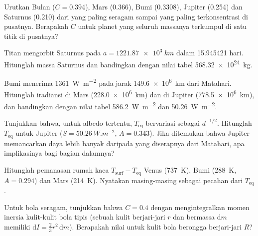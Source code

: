 \begin{exercise}[$\star$]\label{exo:b1:comparative-planetology:4}
Urutkan Bulan ($C = 0.394$), Mars (0.366), Bumi (0.3308), Jupiter (0.254) dan Saturnus (0.210) dari yang paling seragam sampai yang paling terkonsentrasi di pusatnya. Berapakah $C$ untuk planet yang seluruh massanya terkumpul di satu titik di pusatnya?
\end{exercise}

\begin{exercise}[$\star\star$]\label{exo:b1:comparative-planetology:5}
Titan mengorbit Saturnus pada $a = \qty{1221.87e3}{km}$ dalam \num{15.945421} hari. Hitunglah massa Saturnus dan bandingkan dengan nilai tabel \qty{568.32e24}{kg}.
\end{exercise}

\begin{exercise}[$\star\star$]\label{exo:b1:comparative-planetology:6}
Bumi menerima \qty{1361}{W.m^{-2}} pada jarak \qty{149.6e6}{km} dari Matahari. Hitunglah iradiansi di Mars (\qty{228.0e6}{km}) dan di Jupiter (\qty{778.5e6}{km}), dan bandingkan dengan nilai tabel \qty{586.2}{W.m^{-2}} dan \qty{50.26}{W.m^{-2}}.
\end{exercise}

\begin{exercise}[$\star\star$]\label{exo:b1:comparative-planetology:7}
Tunjukkan bahwa, untuk albedo tertentu, $T_\mathrm{eq}$ bervariasi sebagai $d^{-1/2}$. Hitunglah $T_\mathrm{eq}$ untuk Jupiter ($S = \qty{50.26}{W.m^{-2}}$, $A = 0.343$). Jika ditemukan bahwa Jupiter memancarkan daya lebih banyak daripada yang diserapnya dari Matahari, apa implikasinya bagi bagian dalamnya?
\end{exercise}

\begin{exercise}[$\star\star$]\label{exo:b1:comparative-planetology:8}
Hitunglah pemanasan rumah kaca $T_\mathrm{surf} - T_\mathrm{eq}$ Venus (\qty{737}{K}), Bumi (\qty{288}{K}, $A = 0.294$) dan Mars (\qty{214}{K}). Nyatakan masing-masing sebagai pecahan dari $T_\mathrm{eq}$.
\end{exercise}

\begin{exercise}[$\star\star$]\label{exo:b1:comparative-planetology:9}
Untuk bola seragam, tunjukkan bahwa $C = 0.4$ dengan mengintegralkan momen inersia kulit-kulit bola tipis (sebuah kulit berjari-jari $r$ dan bermassa $\mathrm dm$ memiliki $\mathrm dI = \tfrac23 r^2\,\mathrm dm$). Berapakah nilai untuk kulit bola berongga berjari-jari $R$?
\end{exercise}

